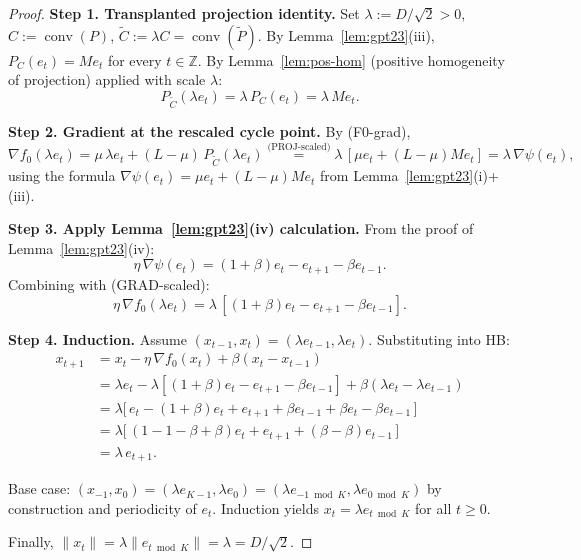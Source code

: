 \documentclass[11pt]{article}
\theoremstyle{definition}
\theoremstyle{remark}
\DeclareMathOperator{\conv}{conv}
\begin{document}
\begin{proof}
\textbf{Step 1. Transplanted projection identity.} Set $\lambda := D/\sqrt 2 > 0$, $C := \conv(P)$, $\widetilde C := \lambda C = \conv(\widetilde P)$. By Lemma~\ref{lem:gpt23}(iii), $P_C(e_t) = M e_t$ for every $t \in \mathbb{Z}$. By Lemma~\ref{lem:pos-hom} (positive homogeneity of projection) applied with scale $\lambda$:
\begin{equation}
  P_{\widetilde C}(\lambda e_t) = \lambda\, P_C(e_t) = \lambda\, M e_t. \tag{PROJ-scaled}
\end{equation}

\textbf{Step 2. Gradient at the rescaled cycle point.} By (F0-grad),
\begin{equation}
  \nabla f_0(\lambda e_t) = \mu\,\lambda e_t + (L - \mu)\, P_{\widetilde C}(\lambda e_t) \stackrel{\text{(PROJ-scaled)}}{=} \lambda\,[\mu e_t + (L-\mu) M e_t] = \lambda\, \nabla \psi(e_t), \tag{GRAD-scaled}
\end{equation}
using the formula $\nabla\psi(e_t) = \mu e_t + (L-\mu) M e_t$ from Lemma~\ref{lem:gpt23}(i)+(iii).

\textbf{Step 3. Apply Lemma~\ref{lem:gpt23}(iv) calculation.} From the proof of Lemma~\ref{lem:gpt23}(iv):
\begin{equation}
  \eta\, \nabla \psi(e_t) = (1 + \beta) e_t - e_{t+1} - \beta e_{t-1}. \tag{GRAD-psi}
\end{equation}
Combining with (GRAD-scaled):
\begin{equation}
  \eta\, \nabla f_0(\lambda e_t) = \lambda\,[(1 + \beta) e_t - e_{t+1} - \beta e_{t-1}]. \tag{GRAD-f0}
\end{equation}

\textbf{Step 4. Induction.} Assume $(x_{t-1}, x_t) = (\lambda e_{t-1}, \lambda e_t)$. Substituting into HB:
\begin{align*}
x_{t+1} &= x_t - \eta\, \nabla f_0(x_t) + \beta(x_t - x_{t-1}) \\
&= \lambda e_t - \lambda[(1+\beta) e_t - e_{t+1} - \beta e_{t-1}] + \beta (\lambda e_t - \lambda e_{t-1}) \\
&= \lambda\big[\,e_t - (1+\beta) e_t + e_{t+1} + \beta e_{t-1} + \beta e_t - \beta e_{t-1}\,\big] \\
&= \lambda\big[\,(1 - 1 - \beta + \beta) e_t + e_{t+1} + (\beta - \beta) e_{t-1}\,\big] \\
&= \lambda\, e_{t+1}.
\end{align*}

Base case: $(x_{-1}, x_0) = (\lambda e_{K-1}, \lambda e_0) = (\lambda e_{-1 \bmod K}, \lambda e_{0 \bmod K})$ by construction and periodicity of $e_t$. Induction yields $x_t = \lambda e_{t \bmod K}$ for all $t \geq 0$.

Finally, $\|x_t\| = \lambda \|e_{t \bmod K}\| = \lambda = D/\sqrt 2$.
\end{proof}
\end{document}

